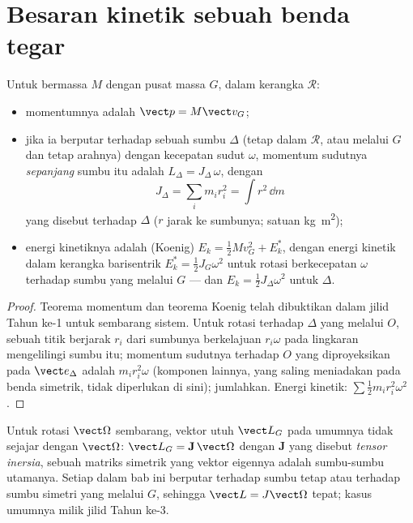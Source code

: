 \section{Besaran kinetik sebuah benda tegar}

\begin{proposition}\label{prop:b2:rigid-body-mechanics:kinetic}
Untuk  bermassa $M$ dengan pusat massa $G$, dalam kerangka
$\mathcal R$:
\begin{itemize}
  \item momentumnya adalah $\vect p = M\vect v_G$;
  \item jika ia berputar terhadap sebuah sumbu $\Delta$ (tetap dalam
        $\mathcal R$, atau melalui $G$ dan tetap arahnya) dengan
        kecepatan sudut $\omega$, momentum sudutnya \emph{sepanjang}
        sumbu itu adalah $L_\Delta = J_\Delta\,\omega$, dengan
        \[
        J_\Delta = \sum_i m_i r_i^2 = \int r^2\,\dd m
        \]
        yang disebut \emph{} terhadap $\Delta$ ($r$ jarak
        ke sumbunya; satuan \unit{kg.m^2});
  \item energi kinetiknya adalah (Koenig) $E_k = \tfrac12Mv_G^2 +
        E_k^*$, dengan energi kinetik dalam kerangka barisentrik
        $E_k^* = \tfrac12J_{G}\omega^2$ untuk rotasi berkecepatan
        $\omega$ terhadap sumbu yang melalui $G$ --- dan
        $E_k = \tfrac12J_\Delta\omega^2$ untuk  $\Delta$.
\end{itemize}
\end{proposition}

\begin{proof}
Teorema momentum dan teorema Koenig telah dibuktikan dalam jilid Tahun
ke-1 untuk sembarang sistem. Untuk rotasi terhadap $\Delta$ yang melalui
$O$, sebuah titik berjarak $r_i$ dari sumbunya berkelajuan $r_i\omega$
pada lingkaran mengelilingi sumbu itu; momentum sudutnya terhadap $O$
yang diproyeksikan pada $\vect e_\Delta$ adalah $m_ir_i^2\omega$
(komponen lainnya, yang saling meniadakan pada benda simetrik, tidak
diperlukan di sini); jumlahkan. Energi kinetik: $\sum\tfrac12m_ir_i^2
\omega^2$.
\end{proof}

\begin{remark}\label{rem:b2:rigid-body-mechanics:tensor}
Untuk rotasi $\vect\Omega$ sembarang, vektor utuh $\vect L_G$ pada
umumnya tidak sejajar dengan $\vect\Omega$: $\vect L_G = \mathbf J\,\vect\Omega$
dengan $\mathbf J$ yang disebut \emph{tensor inersia}, sebuah matriks
simetrik yang vektor eigennya adalah sumbu-sumbu utamanya. Setiap  dalam bab ini berputar terhadap sumbu tetap atau terhadap sumbu
simetri yang melalui $G$, sehingga $\vect L = J\vect\Omega$ tepat; kasus
umumnya milik jilid Tahun ke-3.
\end{remark}

